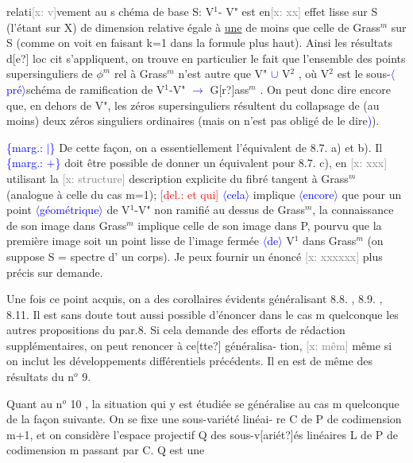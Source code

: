 \documentclass[11pt]{article}
\newcommand{\scanpage}[1]{\par\bigskip\noindent{\small\sffamily[scan #1]}\par}
\newcommand{\mspage}[1]{{\small\sffamily[p.\,#1]}}
\newcommand{\hand}[1]{\textcolor{blue}{#1}}
\newcommand{\inserted}[2][]{\textcolor{blue}{$\langle$#2$\rangle$}}
\newcommand{\margin}[1]{\textcolor{blue}{\{\textsf{marg.:} #1\}}}
\newcommand{\deleted}[1]{\textcolor{red}{[\textsf{del.:} #1]}}
\newcommand{\xout}[1]{\textcolor{gray}{[\textsf{x:} #1]}}
\newcommand{\uline}[1]{\underline{#1}}
\newcommand{\unsure}[1]{[#1?]}
\begin{document}
\clearpage
\scanpage{25/73}
\mspage{68}

relati\xout{v}vement  au s chéma de base S:  V$^1$- V"  est en\xout{xx} effet lisse sur S
(l'étant sur X)  de dimension relative égale à \uline{une} de moins que celle de
Grass$^m$ sur S  (comme on voit en faisant k=1 dans la formule plus haut).
Ainsi  les résultats d\unsure{e}  loc cit  s'appliquent, on trouve en particulier
le fait que l'ensemble des points  supersinguliers  de $\phi^m$ rel à Grass$^m$
n'est autre que V" \hand{$\cup$} V$^2$ , où  V$^2$ est le sous-\inserted{pré}schéma de ramification
de  V$^1$-V" \hand{$\longrightarrow$} G\unsure{r}ass$^m$ .  On peut donc dire encore que, en dehors de V", les
zéros supersinguliers résultent du collapsage de (au moins) deux zéros
singuliers ordinaires (mais on  n'est pas obligé de le dire\hand{)}).

\margin{$|$} De cette façon, on a essentiellement l'équivalent de 8.7. a) et b). Il \margin{$+$}
doit être possible de donner un équivalent pour  8.7. c), en \xout{xxx} utilisant
la \xout{structure} description explicite du fibré tangent  à Grass$^m$ (analogue à
celle du cas m=1); \deleted{et qui} \inserted{cela} implique \inserted{encore} que  pour  un point \inserted{géométrique} de  V$^1$-V"  non
ramifié au dessus  de Grass$^m$, la connaissance de son image dans Grass$^m$
implique celle de son image dans P, pourvu que la première image soit un
point lisse de l'image fermée \inserted{de} V$^1$ dans Grass$^m$  (on suppose S = spectre d'
un corps).  Je peux fournir un énoncé \xout{xxxxxx} plus précis sur demande.

Une fois ce point acquis,  on a des corollaires évidents généralisant
8.8. , 8.9. , 8.11.   Il est sans doute tout aussi possible d'énoncer dans
le cas m quelconque  les autres propositions du par.8. Si cela demande des
efforts de rédaction  supplémentaires, on peut renoncer à ce\unsure{tte} généralisa-%
tion\hand{,} \xout{mêm} même si on inclut les développements différentiels précédents.
Il en est de même des résultats du n$^o$ 9.

Quant au n$^o$ 10 ,  la situation qui y est étudiée se généralise au
cas m quelconque de la façon suivante. On se fixe une sous-variété linéai-
re C de P  de codimension m+1, et on considère l'espace projectif Q des
sous-v\unsure{ariét}és linéaires L de P de codimension m passant par C. Q est une
\end{document}
